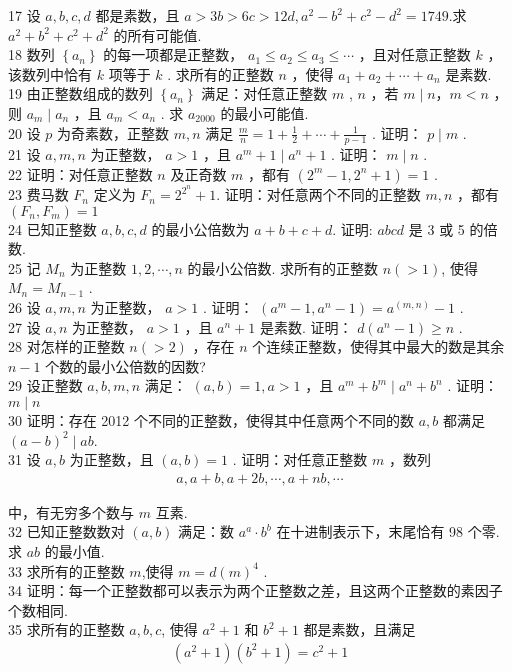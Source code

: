 17 设 $a ,  b ,  c ,  d$ 都是素数，且 $a>3 b>6 c>12 d, a^{2}-b^{2}+c^{2}-d^{2}=1749$.求 $a^{2}+b^{2}+c^{2}+d^{2}$ 的所有可能值. \\
18 数列 $\left\{a_{n}\right\}$ 的每一项都是正整数， $a_{1} \leqslant a_{2} \leqslant a_{3} \leqslant \cdots$ ，且对任意正整数 $k$ ，该数列中恰有 $k$ 项等于 $k$ . 求所有的正整数 $n$ ，使得 $a_{1}+a_{2}+\cdots+a_{n}$ 是素数. \\
19 由正整数组成的数列 $\left\{a_{n}\right\}$ 满足：对任意正整数 $m$ ,  $n$ ，若 $m \mid n ， m<n$ ，则 $a_{m} \mid a_{n}$ ，且 $a_{m}<a_{n}$ . 求 $a_{2000}$ 的最小可能值. \\
20 设 $p$ 为奇素数，正整数 $m ,  n$ 满足 $\frac{m}{n}=1+\frac{1}{2}+\cdots+\frac{1}{p-1}$ . 证明： $p \mid m$ . \\
21 设 $a ,  m ,  n$ 为正整数， $a>1$ ，且 $a^{m}+1 \mid a^{n}+1$ . 证明： $m \mid n$ . \\
22 证明：对任意正整数 $n$ 及正奇数 $m$ ，都有 $\left(2^{m}-1,2^{n}+1\right)=1$ . \\
23 费马数 $F_{n}$ 定义为 $F_{n}=2^{2^{n}}+1$. 证明：对任意两个不同的正整数 $m ,  n$ ，都有 $\left(F_{n}, F_{m}\right)=1$\\
24 已知正整数 $a ,  b ,  c ,  d$ 的最小公倍数为 $a+b+c+d$. 证明: $a b c d$ 是 3 或 5 的倍数. \\
25 记 $M_{n}$ 为正整数 $1,2, \cdots, n$ 的最小公倍数. 求所有的正整数 $n(>1)$, 使得 $M_{n}=M_{n-1}$ . \\
26 设 $a ,  m ,  n$ 为正整数， $a>1$ . 证明： $\left(a^{m}-1, a^{n}-1\right)=a^{(m, n)}-1$ . \\
27 设 $a ,  n$ 为正整数， $a>1$ ，且 $a^{n}+1$ 是素数. 证明： $d\left(a^{n}-1\right) \geqslant n$ . \\
28 对怎样的正整数 $n(>2)$ ，存在 $n$ 个连续正整数，使得其中最大的数是其余 $n-1$ 个数的最小公倍数的因数?\\
29 设正整数 $a ,  b ,  m ,  n$ 满足： $(a, b)=1, a>1$ ，且 $a^{m}+b^{m} \mid a^{n}+b^{n}$ . 证明： $m \mid n$\\
30 证明：存在 2012 个不同的正整数，使得其中任意两个不同的数 $a ,  b$ 都满足 $(a-b)^{2} \mid a b$.\\
31 设 $a ,  b$ 为正整数，且 $(a, b)=1$ . 证明：对任意正整数 $m$ ，数列\\
\begin{align*}
a, a+b, a+2 b, \cdots, a+n b, \cdots
\end{align*}

中，有无穷多个数与 $m$ 互素.\\
32 已知正整数数对 $(a, b)$ 满足：数 $a^{a} \cdot b^{b}$ 在十进制表示下，末尾恰有 98 个零. 求 $a b$ 的最小值. \\
33 求所有的正整数 $m$,使得 $m=d(m)^{4}$ . \\
34 证明：每一个正整数都可以表示为两个正整数之差，且这两个正整数的素因子个数相同. \\
35 求所有的正整数 $a ,  b ,  c$, 使得 $a^{2}+1$ 和 $b^{2}+1$ 都是素数，且满足\\
\begin{align*}
\left(a^{2}+1\right)\left(b^{2}+1\right)=c^{2}+1
\end{align*}

